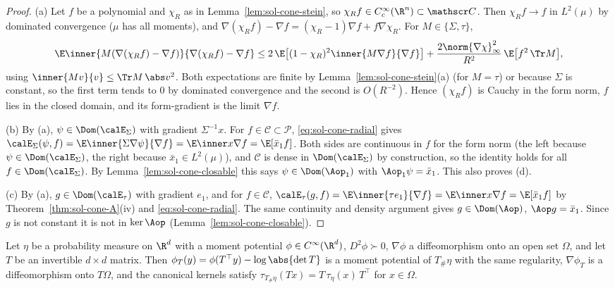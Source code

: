 \documentclass[../main.tex]{subfiles}
\begin{document}
\begin{proof}
(a) Let $f$ be a polynomial and $\chi_R$ as in Lemma~\ref{lem:sol-cone-stein}, so
$\chi_Rf\in C_c^\infty(\R^n)\subset\mathscr C$.  Then $\chi_Rf\to f$ in $L^2(\mu)$ by dominated
convergence ($\mu$ has all moments), and
$\nabla(\chi_Rf)-\nabla f=(\chi_R-1)\nabla f+f\nabla\chi_R$.  For $M\in\{\Sigma,\tau\}$,
\[
  \E\inner{M(\nabla(\chi_Rf)-\nabla f)}{\nabla(\chi_Rf)-\nabla f}
  \le2\,\E\bigl[(1-\chi_R)^2\inner{M\nabla f}{\nabla f}\bigr]
   +\frac{2\norm{\nabla\chi}_\infty^2}{R^2}\,\E\bigl[f^2\,\Tr M\bigr],
\]
using $\inner{Mv}{v}\le\Tr M\,\abs v^2$.  Both expectations are finite by
Lemma~\ref{lem:sol-cone-stein}(a) (for $M=\tau$) or because $\Sigma$ is constant, so the first
term tends to $0$ by dominated convergence and the second is $O(R^{-2})$.  Hence
$(\chi_Rf)$ is Cauchy in the form norm, $f$ lies in the closed domain, and its form-gradient
is the limit $\nabla f$.

(b) By (a), $\psi\in\Dom(\calE_\Sigma)$ with gradient $\Sigma^{-1}x$.  For $f\in\mathscr C\subset\mathscr P$,
\eqref{eq:sol-cone-radial} gives
$\calE_\Sigma(\psi,f)=\E\inner{\Sigma\nabla\psi}{\nabla f}=\E\inner x{\nabla f}=\E[\bar x_1f]$.
Both sides are continuous in $f$ for the form norm (the left because $\psi\in\Dom(\calE_\Sigma)$,
the right because $\bar x_1\in L^2(\mu)$), and $\mathscr C$ is dense in $\Dom(\calE_\Sigma)$ by
construction, so the identity holds for all $f\in\Dom(\calE_\Sigma)$.  By
Lemma~\ref{lem:sol-cone-closable} this says $\psi\in\Dom(\Aop_1)$ with $\Aop_1\psi=\bar x_1$.
This also proves (d).

(c) By (a), $g\in\Dom(\calE_\tau)$ with gradient $e_1$, and for $f\in\mathscr C$,
$\calE_\tau(g,f)=\E\inner{\tau e_1}{\nabla f}=\E\inner x{\nabla f}=\E[\bar x_1f]$ by
Theorem~\ref{thm:sol-cone-A}(iv) and \eqref{eq:sol-cone-radial}.  The same continuity and
density argument gives $g\in\Dom(\Aop)$, $\Aop g=\bar x_1$.  Since $g$ is not constant it is
not in $\ker\Aop$ (Lemma~\ref{lem:sol-cone-closable}).
\end{proof}

\begin{lemma}
\label{lem:sol-cone-affine}
Let $\eta$ be a probability measure on $\R^d$ with a moment potential
$\phi\in C^\infty(\R^d)$, $D^2\phi\succ0$, $\nabla\phi$ a diffeomorphism onto an open
set $\Omega$, and let $T$ be an invertible $d\times d$ matrix.  Then
$\phi_T(y)=\phi(T^\top y)-\log\abs{\det T}$ is a moment potential of $T_\#\eta$ with the same
regularity, $\nabla\phi_T$ is a diffeomorphism onto $T\Omega$, and the canonical kernels
satisfy $\tau_{T_\#\eta}(Tx)=T\,\tau_\eta(x)\,T^\top$ for $x\in\Omega$.
\end{lemma}
\end{document}
